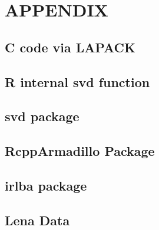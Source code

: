 \documentclass[12pt]{article}
\begin{document}
\newpage
\vskip 0.2in

\nocite{halko2011finding, hastie2015statistical, bruck1975iterative, mazumder2010spectral, oh2015fast, wong2015matrix, nesterov2007gradient, beck2009fast}


\newpage
\section*{APPENDIX}
\subsection*{C code via LAPACK}
	
\subsection*{R internal svd function}
	
\subsection*{svd package}

\subsection*{RcppArmadillo Package}

\subsection*{irlba package}

\subsection*{Lena Data}

\end{document}

